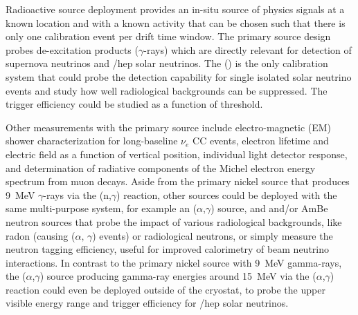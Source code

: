 


Radioactive source deployment provides an in-situ source of physics signals at a known location and with a known activity that can be chosen such that there is only one calibration event per drift time window. The 
primary
source design probes de-excitation products ($\gamma$-rays) which are directly relevant for detection of supernova neutrinos and /hep solar neutrinos. The  () is the only calibration system that could probe the detection capability for single isolated solar neutrino events and study how well radiological backgrounds can be suppressed. The trigger efficiency could be studied as a function of threshold. 

Other measurements with the primary source include electro-magnetic (EM) shower characterization for long-baseline $\nu_e$ CC events, electron lifetime and electric field as a function of  vertical position, individual light detector response, and determination of radiative components of the Michel electron energy spectrum from muon decays. Aside from the 
primary nickel source that produces \SI{9}{\MeV} $\gamma$-rays via the (n,$\gamma$) reaction, other sources could be deployed with the same multi-purpose system, for example an ($\alpha$,$\gamma$)
source, and  and/or AmBe neutron sources that probe the impact of various radiological backgrounds, like radon (causing  ($\alpha,\,\gamma$) events) or radiological neutrons, or simply measure the neutron tagging efficiency, useful for improved calorimetry of beam neutrino interactions. In contrast to the primary %
nickel source with \SI{9}{\MeV} gamma-rays, the ($\alpha$,$\gamma$) source producing gamma-ray energies around \SI{15}{\MeV} via the
($\alpha$,$\gamma$)
reaction could even be deployed outside of the cryostat, to probe the upper visible energy range and trigger efficiency for /hep solar neutrinos. 

